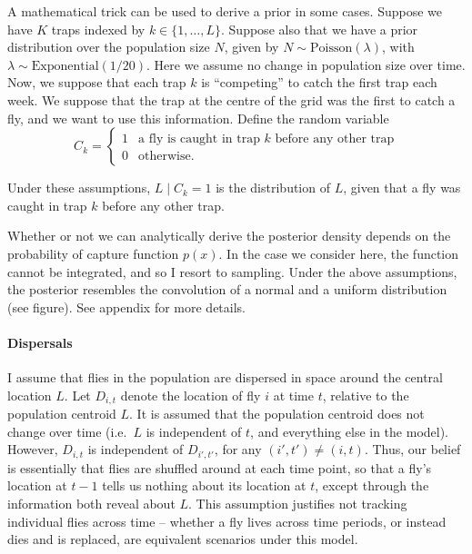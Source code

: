 \documentclass[
]{book}
\begin{document}
A mathematical trick can be used to derive a prior in some cases. Suppose we have \(K\) traps indexed by \(k \in \{1, \ldots, L\}\). Suppose also that we have a prior distribution over the population size \(N\), given by \(N \sim \mathrm{Poisson} (\lambda)\), with \(\lambda \sim \mathrm{Exponential(1/20)}\). Here we assume no change in population size over time. Now, we suppose that each trap \(k\) is ``competing'' to catch the first trap each week. We suppose that the trap at the centre of the grid was the first to catch a fly, and we want to use this information. Define the random variable
\[
C_k = \begin{cases}1 & \text{a fly is caught in trap } k \text{ before any other trap} \\ 0 & \text{otherwise}. \end{cases}
\]

Under these assumptions, \(L \mid C_k = 1\) is the distribution of \(L\), given that a fly was caught in trap \(k\) before any other trap.

Whether or not we can analytically derive the posterior density depends on the probability of capture function \(p(x)\). In the case we consider here, the function cannot be integrated, and so I resort to sampling. Under the above assumptions, the posterior resembles the convolution of a normal and a uniform distribution (see figure). See appendix for more details.

\hypertarget{dispersals}{%
\paragraph{Dispersals}\label{dispersals}}

I assume that flies in the population are dispersed in space around the central location \(L\). Let \(D_{i, t}\) denote the location of fly \(i\) at time \(t\), relative to the population centroid \(L\). It is assumed that the population centroid does not change over time (i.e.~\(L\) is independent of \(t\), and everything else in the model). However, \(D_{i, t}\) is independent of \(D_{i', t'}\), for any \((i', t') \neq (i, t)\). Thus, our belief is essentially that flies are shuffled around at each time point, so that a fly's location at \(t-1\) tells us nothing about its location at \(t\), except through the information both reveal about \(L\). This assumption justifies not tracking individual flies across time -- whether a fly lives across time periods, or instead dies and is replaced, are equivalent scenarios under this model.
\end{document}

